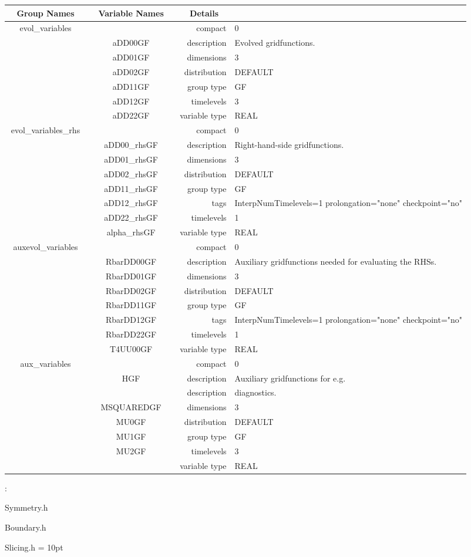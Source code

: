 \begin{tabular*}{150mm}{|c|c@{\extracolsep{\fill}}|rl|} \hline 
~ {\bf Group Names} ~ & ~ {\bf Variable Names} ~  &{\bf Details} ~ & ~\\ 
\hline 
evol\_variables &  & compact & 0 \\ 
 & aDD00GF & description & Evolved gridfunctions. \\ 
 & aDD01GF & dimensions & 3 \\ 
 & aDD02GF & distribution & DEFAULT \\ 
 & aDD11GF & group type & GF \\ 
 & aDD12GF & timelevels & 3 \\ 
 & aDD22GF & variable type & REAL \\ 
\hline 
evol\_variables\_rhs &  & compact & 0 \\ 
 & aDD00\_rhsGF & description & Right-hand-side gridfunctions. \\ 
 & aDD01\_rhsGF & dimensions & 3 \\ 
 & aDD02\_rhsGF & distribution & DEFAULT \\ 
 & aDD11\_rhsGF & group type & GF \\ 
 & aDD12\_rhsGF & tags & InterpNumTimelevels=1 prolongation="none" checkpoint="no" \\ 
 & aDD22\_rhsGF & timelevels & 1 \\ 
 & alpha\_rhsGF & variable type & REAL \\ 
\hline 
auxevol\_variables &  & compact & 0 \\ 
 & RbarDD00GF & description & Auxiliary gridfunctions needed for evaluating the RHSs. \\ 
 & RbarDD01GF & dimensions & 3 \\ 
 & RbarDD02GF & distribution & DEFAULT \\ 
 & RbarDD11GF & group type & GF \\ 
 & RbarDD12GF & tags & InterpNumTimelevels=1 prolongation="none" checkpoint="no" \\ 
 & RbarDD22GF & timelevels & 1 \\ 
 & T4UU00GF & variable type & REAL \\ 
\hline 
aux\_variables &  & compact & 0 \\ 
 & HGF & description & Auxiliary gridfunctions for e.g. \\ 
& ~ & description &  diagnostics. \\ 
 & MSQUAREDGF & dimensions & 3 \\ 
 & MU0GF & distribution & DEFAULT \\ 
 & MU1GF & group type & GF \\ 
 & MU2GF & timelevels & 3 \\ 
 &  & variable type & REAL \\ 
\hline 
\end{tabular*} 



\vspace{5mm}

: 

Symmetry.h

Boundary.h

Slicing.h
\vspace{2mm}\parskip = 10pt 
